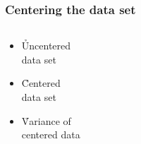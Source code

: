 \documentclass[t]{beamer} %
\begin{document}
\begin{frame}[c]
  \frametitle{Centering the data set}

  \begin{columns}[c]
    \begin{column}{40mm}
      \begin{itemize}
      \item \h<beamer:1| handout:1>{Uncentered\\ data set}%
        \gap
      \item \h<beamer:2| handout:2>{Centered\\ data set}%
        \gap
      \item \h<beamer:3| handout:3>{Variance of\\ centered data}%
        \gap
      \end{itemize}
    \end{column}
    \begin{column}{60mm}
    \end{column}
  \end{columns}
\end{frame}
\end{document}
